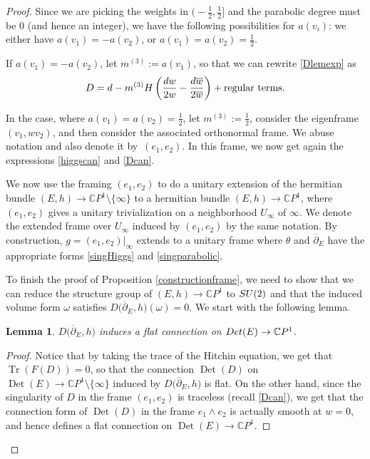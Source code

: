 \documentclass[11pt]{article}
\numberwithin{equation}{section}
\newtheorem{Lemma}[Theorem]{Lemma}
\numberwithin{equation}{section}
\newcommand{\CP}{\mathbb{C}P^1}
\begin{document}
\begin{proof}
Since we are picking the weights in $\bigl(-\frac12,\frac12\bigr]$ and the parabolic degree must be $0$ (and hence an integer), we have the following possibilities for $a(v_i)$: we either have $a(v_1)=-a(v_2)$, or $a(v_1)=a(v_2)=\frac12$.

If $a(v_1)=- a(v_2)$, let $m^{(3)}:=a(v_1)$, so that we can rewrite \eqref{Dlemexp} as
\begin{equation}\label{Dcan}
 D={\rm d}-m^{(3)}H\left(\frac{{\rm d}w}{2w}-\frac{{\rm d}\overline{w}}{2\overline{w}}\right) + \text{regular terms}.
\end{equation}

In the case, where $a(v_1)=a(v_2)=\frac12$, let $m^{(3)}:=\frac12$, consider the eigenframe $(v_1,wv_2)$, and then consider the associated orthonormal frame. We abuse notation and also denote it by~$(e_1,e_2)$. In this frame, we now get again the expressions \eqref{higgscan} and \eqref{Dcan}.

We now use the framing $(e_1,e_2)$ to do a unitary extension of the hermitian bundle $(E,h)\to \CP \setminus \{\infty\}$ to a hermitian bundle $(E,h)\to \CP$, where $(e_1,e_2)$ gives a unitary trivialization on a neighborhood $U_{\infty}$ of $\infty$. We denote the extended frame over $U_{\infty}$ induced by $(e_1,e_2)$ by the same notation. By construction, $g=(e_1,e_2)|_{\infty}$ extends to a unitary frame where $\theta$ and $\overline{\partial}_E$ have the appropriate forms \eqref{singHiggs} and \eqref{singparabolic}.

To finish the proof of Proposition \ref{constructionframe}, we need to show that we can reduce the structure group of $(E,h)\to \CP$ to ${\rm SU}(2)$ and that the induced volume form $\omega$ satisfies $D\bigl(\overline{\partial}_E,h\bigr)(\omega)=0$. We start with the following lemma.

\begin{Lemma} $D\bigl(\overline{\partial}_E,h\bigr)$ induces a flat connection on $\textnormal{Det}(E)\to \CP$.
\end{Lemma}

\begin{proof}Notice that by taking the trace of the Hitchin equation, we get that $\operatorname{Tr}(F(D))=0$, so that the connection $\operatorname{Det}(D)$ on $\operatorname{Det}(E)\to \CP \setminus \{\infty\}$ induced by $D\bigl(\overline{\partial}_E,h\bigr)$ is flat. On the other hand, since the singularity of $D$ in the frame $(e_1,e_2)$ is traceless (recall \eqref{Dcan}), we get that the connection form of $\operatorname{Det}(D)$ in the frame $e_1\wedge e_2$ is actually smooth at $w=0$, and hence defines a flat connection on $\operatorname{Det}(E)\to \CP$.
\end{proof}



\end{proof}
\end{document}
